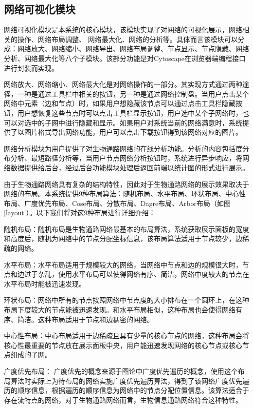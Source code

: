 \subsection{网络可视化模块}
网络可视化模块是本系统的核心模块，该模块实现了对网络的可视化展示，网络相关的操作、网络布局调整、 网络最大化、网络的分析等。具体而言该模块可以分成：网络放大、网络缩小、网络导出、网络布局调整、节点显示、节点隐藏、网络分析、网络最大化等八个子模块。该部分功能是对Cytoscape在浏览器端编程接口进行封装而实现。 

网络放大、网络缩小、网络最大化是对网络操作的一部分。其实现方式通过两种途径，一种是通过工具栏中相关的按钮，另一种是通过网络控制盘。当用户点击某个网络中元素（边和节点）时，如果用户想隐藏该节点可以通过点击工具栏隐藏按钮，用户想恢复这些节点时可以点击工具栏显示按钮，用户选中某个子网络时，也可以对选中的子网中进行隐藏和显示。如果用户对系统当前的网络满意时，系统提供了以图片格式导出网络功能，用户可以点击下载按钮得到该网络对应的图片。

网络分析模块为用户提供了对生物通路网络的在线分析功能。分析的内容包括度分布分析、最短路径分析等，当用户节点网络分析按钮时，系统进行异步响应，将网络数据提供给后台，经过后台功能模块处理后返回前端以统计图的形式进行展示。

由于生物通路网络具有复杂的结构特性，因此对于生物通路网络的展示效果取决于网络的布局。本系统提供9种布局算法：随机布局、水平布局、环状布局、中心性布局、广度优先布局、Cose布局、分散布局、Dagre布局、Arbor布局（如图\ref{layout}）。以下我们将对这9种布局进行详细介绍：

随机布局：随机布局是生物通路网络最基本的布局算法，系统获取展示面板的宽度和高度后，随机为网络中的节点分配坐标信息，该布局算法适用于节点较少，边稀疏的网络。

水平布局：水平布局适用于规模较大的网络，当网络中节点和边的规模很大时，节点和边过于杂乱，使用水平布局可以使得网络有序、简洁，网络中度较大的节点在水平布局时能被迅速发现。

环状布局：网络中所有的节点按照网络中节点度的大小排布在一个圆环上，在这种布局下度较大的节点能被迅速发现。和水平布局相似，这种布局也会使得网络有序、简洁。这种布局适用于节点和边稠密的网络。

中心性布局：中心布局适用于边稀疏且具有少量的核心节点的网络，这种布局会将核心性最重要的节点放在展示面板中央，用户能迅速发现网络的核心节点或核心节点组成的子网。

广度优先布局： 广度优先的概念来源于图论中广度优先遍历的概念，使用这个布局算法时实际上为待布局的网络实施广度优先遍历算法，得到了该网络广度优先遍历的顺序信息，根据遍历的顺序信息为网络中的节点分配位置信息。该算法适合于存在流特点的网络，对于生物通路网络而言，生物信息通路网络符合这种特性。

